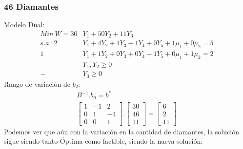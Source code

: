\begin{homeworkProblem}
\subsubsection{46 Diamantes}
Modelo Dual:
\begin{align*}
    Min\ W = 30&Y_1 + 50Y_2 + 11Y_3 \\
    s.a.: 2&Y_1 + 4Y_2 + 1Y_3 - 1Y_4 + 0Y_5 + 1\mu_1 + 0\mu_2 = 5 \\ 
     1&Y_1 + 1Y_2 + 0Y_3 + 0Y_4 - 1Y_5 + 0\mu_1 + 1\mu_2 = 2 \\ 
     &Y_1,Y_2 \ge 0 \\ -&Y_3 \ge 0
\end{align*}
Rango de variación de $b_2$:
\begin{align*}
    B^{-1}.b_n = b^{*} \\
    \begin{bmatrix}
        1 & -1 & 2 \\
        0 & 1 & -4 \\
        0 & 0 & 1 
    \end{bmatrix}.
    \begin{bmatrix}
        30 \\
        46 \\
        11
    \end{bmatrix}=
    \begin{bmatrix}
        6 \\
        2\\
        11
    \end{bmatrix}
\end{align*}
Podemos ver que aún con la variación en la cantidad de diamantes, la solución sigue siendo tanto Óptima como factible, siendo la nueva solución:


\end{homeworkProblem}
